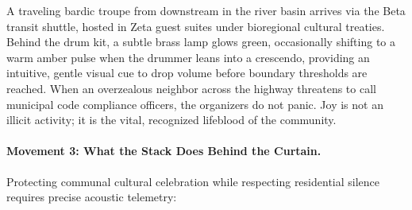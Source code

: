 A traveling bardic troupe from downstream in the river basin arrives via the Beta transit shuttle, hosted in Zeta guest suites under bioregional cultural treaties. Behind the drum kit, a subtle brass lamp glows green, occasionally shifting to a warm amber pulse when the drummer leans into a crescendo, providing an intuitive, gentle visual cue to drop volume before boundary thresholds are reached. When an overzealous neighbor across the highway threatens to call municipal code compliance officers, the organizers do not panic. Joy is not an illicit activity; it is the vital, recognized lifeblood of the community.

\paragraph{Movement 3: What the Stack Does Behind the Curtain.}
Protecting communal cultural celebration while respecting residential silence requires precise acoustic telemetry:
